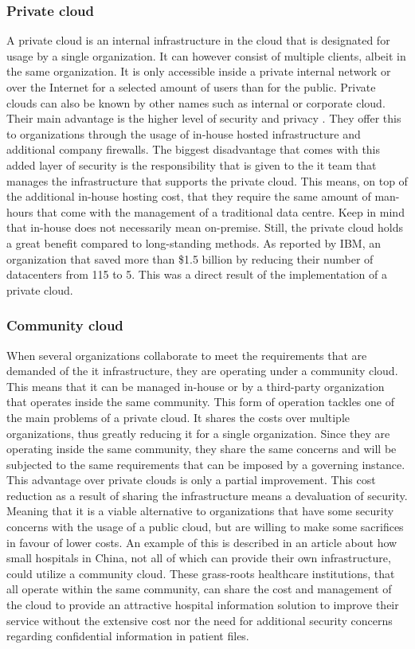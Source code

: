 \subsubsection{Private cloud}
A private cloud is an internal infrastructure in the cloud that is designated for usage by a single organization. It can however consist of multiple clients, albeit in the same organization. It is only accessible inside a private internal network or over the Internet for a selected amount of users than for the public. Private clouds can also be known by other names such as internal or corporate cloud. Their main advantage is the higher level of security and privacy . They offer this to organizations through the usage of in-house hosted infrastructure and additional company firewalls. The biggest disadvantage that comes with this added layer of security is the responsibility that is given to the \acrfull{it} team that manages the infrastructure that supports the private cloud. This means, on top of the additional in-house hosting cost, that they require the same amount of man-hours that come with the management of a traditional data centre. Keep in mind that in-house does not necessarily mean on-premise.
Still, the private cloud holds a great benefit compared to long-standing methods. As reported by IBM, an organization that saved more than \$1.5 billion by reducing their number of datacenters from 115 to 5. This was a direct result of the implementation of a private cloud. \autocite{Hofmann2010} 


\subsubsection{Community cloud}
When several organizations collaborate to meet the requirements that are demanded of the \acrshort{it} infrastructure, they are operating under a community cloud. This means that it can be managed in-house or by a third-party organization that operates inside the same community. This form of operation tackles one of the main problems of a private cloud. It shares the costs over multiple organizations, thus greatly reducing it for a single organization. Since they are operating inside the same community, they share the same concerns and will be subjected to the same requirements that can be imposed by a governing instance. 
This advantage over private clouds is only a partial improvement. This cost reduction as a result of sharing the infrastructure means a devaluation of security. Meaning that it is a viable alternative to  organizations that have some security concerns with the usage of a public cloud, but are willing to make some sacrifices in favour of lower costs. 
\newline
An example of this is described in an article \autocite{Yao2014} about how small hospitals in China, not all of which can provide their own infrastructure, could utilize a community cloud. These grass-roots healthcare institutions, that all operate within the same community, can share the cost and management of the cloud to provide an attractive hospital information solution to improve their service without the extensive cost nor the need for additional security concerns regarding confidential information in patient files.

